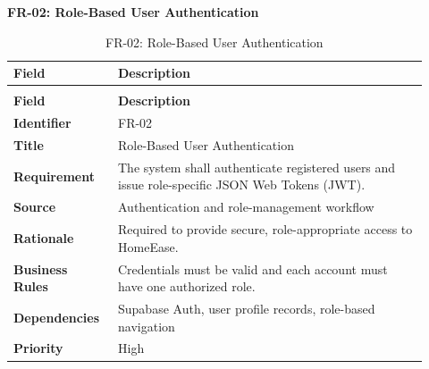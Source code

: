 \documentclass[12pt,a4paper]{article}
\begin{document}
\noindent\textbf{FR-02: Role-Based User Authentication}\par
\vspace{4pt}
\begingroup\small\setlength{\tabcolsep}{4pt}\renewcommand{\arraystretch}{1.15}
\begin{longtable}{|>{\raggedright\arraybackslash}p{0.22\linewidth}|>{\raggedright\arraybackslash}p{0.70\linewidth}|}
\caption{FR-02: Role-Based User Authentication}\label{tab:fr-02}\\
\hline
\textbf{Field} & \textbf{Description} \\ \hline
\endfirsthead
\multicolumn{2}{c}{Table \thetable\ Role-Based User Authentication (continued)}\\
\hline
\textbf{Field} & \textbf{Description} \\ \hline
\endhead
\textbf{Identifier} & FR-02 \\ \hline
\textbf{Title} & Role-Based User Authentication \\ \hline
\textbf{Requirement} & The system shall authenticate registered users and issue role-specific JSON Web Tokens (JWT). \\ \hline
\textbf{Source} & Authentication and role-management workflow \\ \hline
\textbf{Rationale} & Required to provide secure, role-appropriate access to HomeEase. \\ \hline
\textbf{Business Rules} & Credentials must be valid and each account must have one authorized role. \\ \hline
\textbf{Dependencies} & Supabase Auth, user profile records, role-based navigation \\ \hline
\textbf{Priority} & High \\ \hline
\end{longtable}
\endgroup
\clearpage
\end{document}

